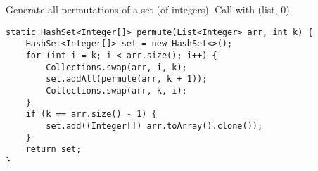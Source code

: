 Generate all permutations of a set (of integers). Call with (list, 0).
\begin{verbatim}
static HashSet<Integer[]> permute(List<Integer> arr, int k) {
	HashSet<Integer[]> set = new HashSet<>();
	for (int i = k; i < arr.size(); i++) {
		Collections.swap(arr, i, k);
		set.addAll(permute(arr, k + 1));
		Collections.swap(arr, k, i);
	}
	if (k == arr.size() - 1) {
		set.add((Integer[]) arr.toArray().clone());
	}
	return set;
}
\end{verbatim}